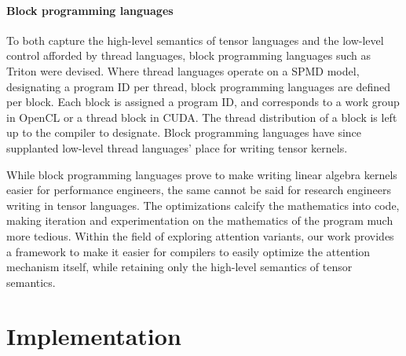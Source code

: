 \documentclass[review, anonymous, sigplan]{acmart}
\begin{document}
\paragraph{Block programming languages} To both capture the high-level semantics of tensor languages and the low-level control afforded by thread languages, block programming languages such as Triton were devised. Where thread languages operate on a SPMD model, designating a program ID per thread, block programming languages are defined per block. Each block is assigned a program ID, and corresponds to a work group in OpenCL or a thread block in CUDA. The thread distribution of a block is left up to the compiler to designate. Block programming languages have since supplanted low-level thread languages' place for writing tensor kernels.

While block programming languages prove to make writing linear algebra kernels easier for performance engineers, the same cannot be said for research engineers writing in tensor languages. The optimizations calcify the mathematics into code, making iteration and experimentation on the mathematics of the program much more tedious. Within the field of exploring attention variants, our work provides a framework to make it easier for compilers to easily optimize the attention mechanism itself, while retaining only the high-level semantics of tensor semantics. 

\section{Implementation}
\label{sec:implementation}
\end{document}
